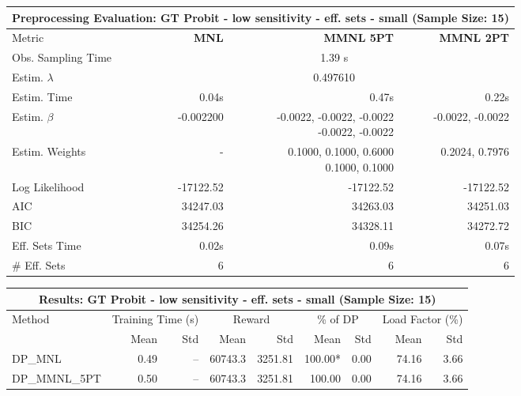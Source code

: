 
\begin{samepage}
\begin{center}
  \small
  \begin{tabular}{l|r|r|r}
    \toprule
    \multicolumn{4}{c}{\textbf{Preprocessing Evaluation: GT Probit - low sensitivity - eff. sets - small (Sample Size: 15)}} \\
    \midrule
    Metric & \textbf{MNL} & \textbf{MMNL 5PT} & \textbf{MMNL 2PT} \\
    \midrule
    Obs. Sampling Time & \multicolumn{3}{c}{1.39 s} \\
    Estim. $\lambda$ & \multicolumn{3}{c}{0.497610} \\
    Estim. Time & 0.04s & 0.47s & 0.22s \\
    Estim. $\beta$ & -0.002200 & \makecell[tr]{-0.0022, -0.0022, -0.0022 \\ -0.0022, -0.0022} & -0.0022, -0.0022 \\
    Estim. Weights & - & \makecell[tr]{0.1000, 0.1000, 0.6000 \\ 0.1000, 0.1000} & 0.2024, 0.7976 \\
    Log Likelihood & -17122.52 & -17122.52 & -17122.52 \\
    AIC & 34247.03 & 34263.03 & 34251.03 \\
    BIC & 34254.26 & 34328.11 & 34272.72 \\
    Eff. Sets Time & 0.02s & 0.09s & 0.07s \\
    \# Eff. Sets & 6 & 6 & 6 \\
    \bottomrule
  \end{tabular}
\end{center}
\begin{center}
  \small
  \begin{tabular}{l|rr|rr|rr|rr}
    \toprule
    \multicolumn{9}{c}{\textbf{Results: GT Probit - low sensitivity - eff. sets - small (Sample Size: 15)}} \\
    \midrule
    Method & \multicolumn{2}{c|}{Training Time (s)} & \multicolumn{2}{c|}{Reward} & \multicolumn{2}{c|}{\% of DP} & \multicolumn{2}{c}{Load Factor (\%)} \\
    & Mean & Std & Mean & Std & Mean & Std & Mean & Std \\
    \midrule
    DP\_MNL      &     0.49 &    -- &    60743.3 &    3251.81 & 100.00* &    0.00 &   74.16 &    3.66 \\
    DP\_MMNL\_5PT &     0.50 &    -- &    60743.3 &    3251.81 &  100.00 &    0.00 &   74.16 &    3.66 \\

\end{tabular}
\end{center}
\end{samepage}
